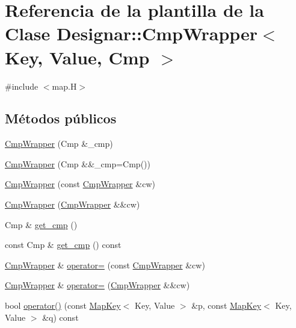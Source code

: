 \hypertarget{class_designar_1_1_cmp_wrapper}{}\section{Referencia de la plantilla de la Clase Designar\+:\+:Cmp\+Wrapper$<$ Key, Value, Cmp $>$}
\label{class_designar_1_1_cmp_wrapper}


{\ttfamily \#include $<$map.\+H$>$}

\subsection*{Métodos públicos}
\begin{DoxyCompactItemize}
\item 
\hyperlink{class_designar_1_1_cmp_wrapper_a2fe493e155e893254b689c5933c61ebb}{Cmp\+Wrapper} (Cmp \&\+\_\+cmp)
\item 
\hyperlink{class_designar_1_1_cmp_wrapper_af471969d033f9f7b5d306a0755af43c6}{Cmp\+Wrapper} (Cmp \&\&\+\_\+cmp=Cmp())
\item 
\hyperlink{class_designar_1_1_cmp_wrapper_a7112a8dabf2f50f09173078de19ab7d2}{Cmp\+Wrapper} (const \hyperlink{class_designar_1_1_cmp_wrapper}{Cmp\+Wrapper} \&cw)
\item 
\hyperlink{class_designar_1_1_cmp_wrapper_a985bdd51796dfac3d77eff525d364a90}{Cmp\+Wrapper} (\hyperlink{class_designar_1_1_cmp_wrapper}{Cmp\+Wrapper} \&\&cw)
\item 
Cmp \& \hyperlink{class_designar_1_1_cmp_wrapper_a46bfc0600123bbb9166e870067861ded}{get\+\_\+cmp} ()
\item 
const Cmp \& \hyperlink{class_designar_1_1_cmp_wrapper_a1f4fe6315f3f96a383be1cc51909e072}{get\+\_\+cmp} () const
\item 
\hyperlink{class_designar_1_1_cmp_wrapper}{Cmp\+Wrapper} \& \hyperlink{class_designar_1_1_cmp_wrapper_a958a9c52db5cc8e9b809af0adc4f90f4}{operator=} (const \hyperlink{class_designar_1_1_cmp_wrapper}{Cmp\+Wrapper} \&cw)
\item 
\hyperlink{class_designar_1_1_cmp_wrapper}{Cmp\+Wrapper} \& \hyperlink{class_designar_1_1_cmp_wrapper_a7885c41d00b53a31f1fe4d15bcf53e00}{operator=} (\hyperlink{class_designar_1_1_cmp_wrapper}{Cmp\+Wrapper} \&\&cw)
\item 
bool \hyperlink{class_designar_1_1_cmp_wrapper_a1b715375bf0bdd7ffefdb8ada447c191}{operator()} (const \hyperlink{namespace_designar_a7394b1b25278abf7211e77b91eb5204f}{Map\+Key}$<$ Key, Value $>$ \&p, const \hyperlink{namespace_designar_a7394b1b25278abf7211e77b91eb5204f}{Map\+Key}$<$ Key, Value $>$ \&q) const
\end{DoxyCompactItemize}


